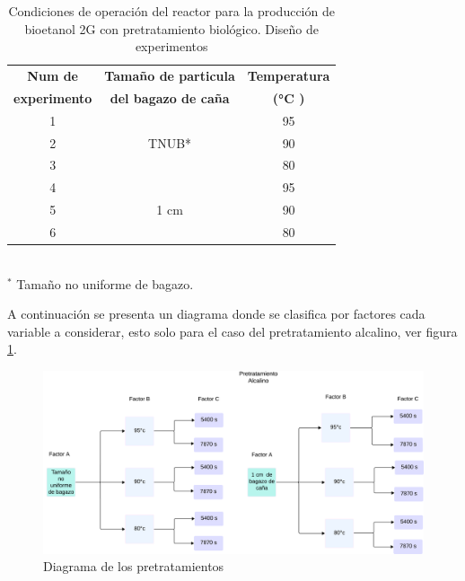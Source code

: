 \documentclass[12pt]{article}
\begin{document}
\begin{table}[H]
	\centering
	\caption{Condiciones de operación del reactor para la producción de bioetanol 2G con pretratamiento biológico. Diseño de experimentos}
	\label{alcalino}
	\begin{tabular}{|c|c|c|  }
		\hline
		\textbf{Num de} & \textbf{Tamaño de particula } & \textbf{Temperatura} \\
	\textbf{experimento}	& \textbf{ del bagazo de caña} &   \textbf{(°C )}  \\		
		\hline
		1   & \multirow{3}{*}{TNUB*} & 95  \\	\cline{1-1}	
		2 &  & 90 \\ \cline{1-1} 						
		3 &  & 80 \\ \cline{1-3}			
		4 &\multirow{3}{*}{1 cm} & 95    \\\cline{1-1}			
		5 &  & 90   \\  \cline{1-1}				
		6 &  & 80     \\  \cline{1-1}		
		\hline
	\end{tabular}
		\\[3 pt] %
\footnotesize{$^{*}$  Tamaño no uniforme de bagazo.}
\end{table}





A continuación se presenta un diagrama donde se clasifica por factores cada variable a considerar, esto solo para el caso del pretratamiento alcalino, ver figura  \ref{Diagrama1}.



\begin{figure} [H]
	\centering
	\includegraphics[width=0.9\linewidth]{imagenes/Diagrama alcalino}
	\caption{Diagrama de los pretratamientos}
	\label{Diagrama1}
\end{figure}
\end{document}
